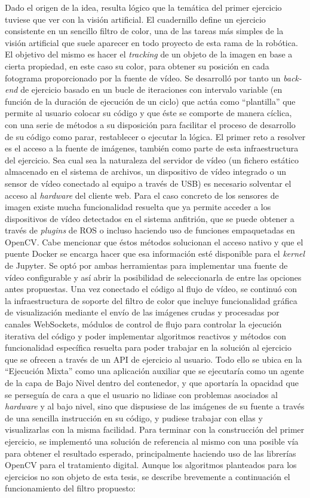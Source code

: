 Dado el origen de la idea, resulta lógico que la temática del primer ejercicio tuviese que ver con la visión artificial. El cuadernillo define un ejercicio consistente en un sencillo filtro de color, una de las tareas más simples de la visión artificial que suele aparecer en todo proyecto de esta rama de la robótica. El objetivo del mismo es hacer el \textit{tracking} de un objeto de la imagen en base a cierta propiedad, en este caso su color, para obtener su posición en cada fotograma proporcionado por la fuente de vídeo. Se desarrolló por tanto un \textit{back-end} de ejercicio basado en un bucle de iteraciones con intervalo variable (en función de la duración de ejecución de un ciclo) que actúa como ``plantilla'' que permite al usuario colocar su código y que éste se comporte de manera cíclica, con una serie de métodos a su disposición para facilitar el proceso de desarrollo de su código como parar, restablecer o ejecutar la lógica. El primer reto a resolver es el acceso a la fuente de imágenes, también como parte de esta infraestructura del ejercicio. Sea cual sea la naturaleza del servidor de vídeo (un fichero estático almacenado en el sistema de archivos, un dispositivo de vídeo integrado o un sensor de vídeo conectado al equipo a través de USB) es necesario solventar el acceso al \textit{hardware} del cliente web. Para el caso concreto de los sensores de imagen existe mucha funcionalidad resuelta que ya permite acceder a los dispositivos de vídeo detectados en el sistema anfitrión, que se puede obtener a través de \textit{plugins} de ROS o incluso haciendo uso de funciones empaquetadas en OpenCV. Cabe mencionar que éstos métodos solucionan el acceso nativo y que el puente Docker se encarga hacer que esa información esté disponible para el \textit{kernel} de Jupyter. Se optó por ambas herramientas para implementar una fuente de vídeo configurable y así abrir la posibilidad de seleccionarla de entre las opciones antes propuestas. Una vez conectado el código al flujo de vídeo, se continuó con la infraestructura de soporte del filtro de color que incluye funcionalidad gráfica de visualización mediante el envío de las imágenes crudas y procesadas por canales WebSockets, módulos de control de flujo para controlar la ejecución iterativa del código y poder implementar algoritmos reactivos y métodos con funcionalidad específica resuelta para poder trabajar en la solución al ejercicio que se ofrecen a través de un API de ejercicio al usuario. Todo ello se ubica en la ``Ejecución Mixta'' como una aplicación auxiliar que se ejecutaría como un agente de la capa de Bajo Nivel dentro del contenedor, y que aportaría la opacidad que se perseguía de cara a que el usuario no lidiase con problemas asociados al \textit{hardware} y al bajo nivel, sino que dispusiese de las imágenes de su fuente a través de una sencilla instrucción en su código, y pudiese trabajar con ellas y visualizarlas con la misma facilidad. Para terminar con la construcción del primer ejercicio, se implementó una solución de referencia al mismo con una posible vía para obtener el resultado esperado, principalmente haciendo uso de las librerías OpenCV para el tratamiento digital. Aunque los algoritmos planteados para los ejercicios no son objeto de esta tesis, se describe brevemente a continuación el funcionamiento del filtro propuesto:

